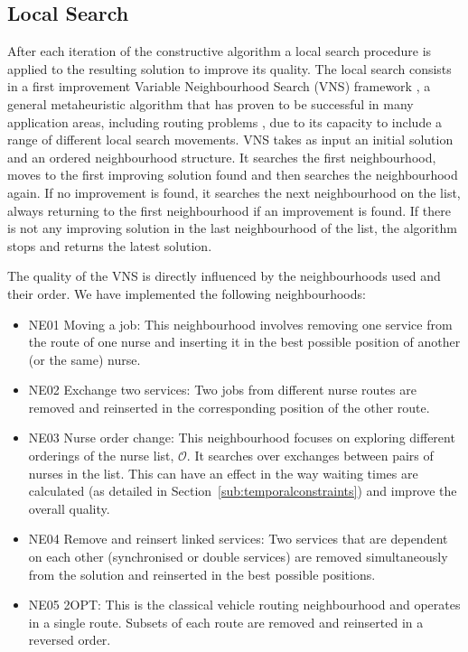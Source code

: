 \documentclass[a4paper,11pt,authoryear]{elsarticle}
\begin{document}
\subsection{Local Search}
\label{sub:localsearch}
\noindent After each iteration of the constructive algorithm a local search procedure is applied to the resulting solution to improve its quality. The local search consists in a first improvement Variable Neighbourhood Search (VNS) framework \citep{mladenovic1997}, a general metaheuristic algorithm that has proven to be successful in many application areas, including routing problems \citep{hansen2010}, due to its capacity to include a range of different local search movements. VNS takes as input an initial solution and an ordered neighbourhood structure. It searches the first neighbourhood, moves to the first improving solution found and then searches the neighbourhood again. If no improvement is found, it searches the next neighbourhood on the list, always returning to the first neighbourhood if an improvement is found. If there is not any improving solution in the last neighbourhood of the list, the algorithm stops and returns the latest solution.

The quality of the VNS is directly influenced by the neighbourhoods used and their order. We have implemented the following neighbourhoods:
\begin{itemize}
    \item NE01 Moving a job: This neighbourhood involves removing one service from the route of one nurse and inserting it in the best possible position of another (or the same) nurse.
    \item NE02 Exchange two services: Two jobs from different nurse routes are removed and reinserted in the corresponding position of the other route.
    \item NE03 Nurse order change: This neighbourhood focuses on exploring different orderings of the nurse list, $\mathcal{O}$. It searches over exchanges between pairs of nurses in the list. 
    This can have an effect in the way waiting times are calculated (as detailed in Section~\ref{sub:temporalconstraints}) and improve the overall quality.
    \item NE04 Remove and reinsert linked services: Two services that are dependent on each other (synchronised or double services) are removed simultaneously from the solution and reinserted in the best possible positions.
    \item NE05 2OPT: This is the classical vehicle routing neighbourhood and operates in a single route. Subsets of each route are removed and reinserted in a reversed order.
\end{itemize}
\end{document}
